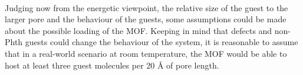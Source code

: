 \documentclass[11pt]{article}
\begin{document}
\\ \par \noindent
Judging now from the energetic viewpoint, the relative size of the guest to the larger pore and the behaviour of the guests, some assumptions could be made about the possible loading of the MOF. Keeping in mind that defects and non-Phth guests could change the behaviour of the system, it is reasonable to assume that in a real-world scenario at room temperature, the MOF would be able to host at least three guest molecules per 20 Å of pore length.

\clearpage







\end{document}
